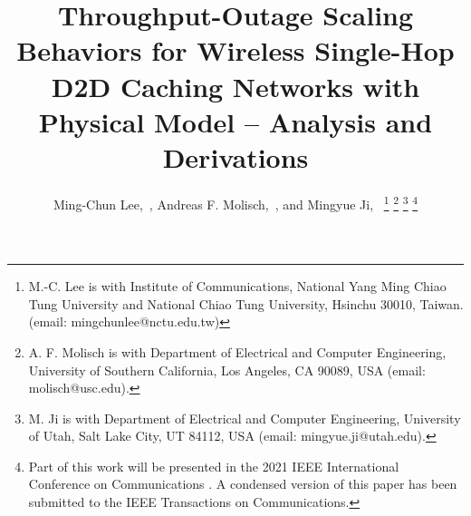 \documentclass[journal,draftclsnofoot,onecolumn,12pt,twoside]{IEEEtran}
\begin{document}
%
\title{Throughput-Outage Scaling Behaviors for Wireless Single-Hop D2D Caching Networks with Physical Model -- Analysis and Derivations}


\author{Ming-Chun Lee,~, Andreas F. Molisch,~, and Mingyue Ji,~
\thanks{M.-C. Lee is with Institute of Communications, National Yang Ming Chiao Tung University and National Chiao Tung University, Hsinchu 30010, Taiwan. (email: mingchunlee@nctu.edu.tw)}
\thanks {A. F. Molisch is with Department of Electrical and Computer Engineering, University of Southern California, Los Angeles, CA 90089, USA (email: molisch@usc.edu).}
\thanks{M. Ji is with Department of Electrical and Computer Engineering, University of Utah, Salt Lake City, UT 84112, USA (email: mingyue.ji@utah.edu).}
\thanks{Part of this work will be presented in the 2021 IEEE International Conference on Communications \cite{lee2021throughput}. A condensed version of this paper has been submitted to the IEEE Transactions on Communications.}
}


%
\end{document}
